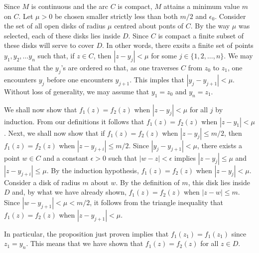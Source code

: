 \documentclass[12pt]{article}
\begin{document}
Since $M$ is continuous and the arc $C$ is compact, $M$ attains a minimum value $m$ on $C$.  Let $\mu > 0$ be chosen smaller strictly less than both $m/2$ and $\epsilon_0$. Consider the set of all open disks of radius $\mu$ centred about ponts of $C$.  By the way $\mu$ was selected, each of these disks lies inside $D$.  Since $C$ is compact a finite subset of these disks will serve to cover $D$.  In other words, there exsits a finite set of points $y_1, y_2, \ldots y_n$ such that, if $z \in C$, then $|z - y_j| < \mu$ for some $j \in \{1,2,\ldots,n\}$.  We may assume that the $y_j$'s are ordered so that, as one traverses $C$ from $z_0$ to $z_1$, one encounters $y_j$ before one encounters $y_{j+1}$.  This imples that $|y_j - y_{j+1}| < \mu$.  Without loss of generality, we may assume that $y_1 = z_0$ and $y_n = z_1$.

We shall now show that $f_1 (z) = f_2(z)$ when $|z - y_j| < \mu$ for all $j$ by induction.  From our definitions it follows that $f_1 (z) = f_2 (z)$ when $|z - y_1| < \mu$.  Next, we shall now show that if $f_1 (z) = f_2 (z)$ when $|z - y_j| \le m/2$, then $f_1 (z) = f_2 (z)$ when $|z - y_{j+i}| \le m/2$.  Since $|y_j - y_{j+1}| < \mu$, there exists a point $w \in C$ and a constant $\epsilon > 0$ such that $|w - z| < \epsilon$ implies $|z - y_j| \le \mu$ and $|z - y_{j+i}| \le \mu$.  By the induction hypothesis, $f_1 (z) = f_2 (z)$ when $|z - y_j| < \mu$.  Consider a disk of radius $m$ about $w$.  By the definition of $m$, this disk lies inside $D$ and, by what we have already shown, $f_1(z) = f_2 (z)$ when $|z - w| \le m$.  Since $|w - y_{j+1}| < \mu < m/2$, it follows from the triangle inequality that $f_1 (z) = f_2 (z)$ when $|z - y_{j+1}| < \mu$.

In particular, the proposition just proven implies that $f_1 (z_1) = f_1 (z_1)$ since $z_1 = y_n$.  This means that we have shown that $f_1 (z) = f_2 (z)$ for all $z \in D$.
\end{document}
